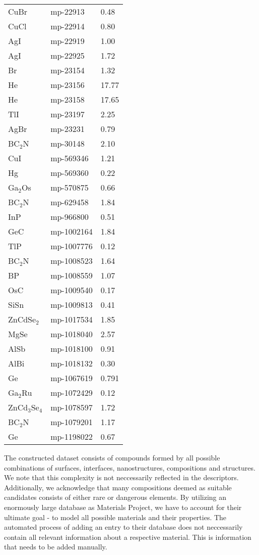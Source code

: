 \begin{center}
\begin{longtable}{M{3.0cm} M{3.0cm} M{3.5cm}}
  CuBr & mp-22913 & 0.48\\
  CuCl & mp-22914 & 0.80\\
  AgI & mp-22919 & 1.00\\
  AgI & mp-22925 & 1.72\\
  Br & mp-23154 & 1.32\\
  He & mp-23156 & 17.77\\
  He & mp-23158 & 17.65\\
  TlI & mp-23197 & 2.25\\
  AgBr & mp-23231 & 0.79\\
  BC$_2$N & mp-30148 & 2.10\\
  CuI & mp-569346 & 1.21\\
  Hg & mp-569360 & 0.22\\
  Ga$_2$Os & mp-570875 & 0.66\\
  BC$_2$N & mp-629458 & 1.84\\
  InP & mp-966800 & 0.51\\
  GeC & mp-1002164 & 1.84\\
  TlP & mp-1007776 & 0.12\\
  BC$_2$N & mp-1008523 & 1.64\\
  BP & mp-1008559 & 1.07\\
  OsC & mp-1009540 & 0.17\\
  SiSn & mp-1009813 & 0.41\\
  ZnCdSe$_2$ & mp-1017534 & 1.85\\
  MgSe & mp-1018040 & 2.57\\
  AlSb & mp-1018100 & 0.91\\
  AlBi & mp-1018132 & 0.30\\
  Ge & mp-1067619 & 0.791\\
  Ga$_2$Ru & mp-1072429 & 0.12\\
  ZnCd$_3$Se$_4$ & mp-1078597 & 1.72\\
  BC$_2$N & mp-1079201 & 1.17\\
  Ge & mp-1198022 & 0.67\\
  \hline
\end{longtable}
\end{center}

The constructed dataset consists of compounds formed by all possible combinations of surfaces, interfaces, nanostructures, compositions and structures. We note that this complexity is not neccessarily reflected in the descriptors. Additionally, we acknowledge that many compositions deemed as suitable candidates consists of either rare or dangerous elements. By utilizing an enormously large database as Materials Project, we have to account for their ultimate goal - to model all possible materials and their properties. The automated process of adding an entry to their database does not neccessarily contain all relevant information about a respective material. This is information that needs to be added manually.

